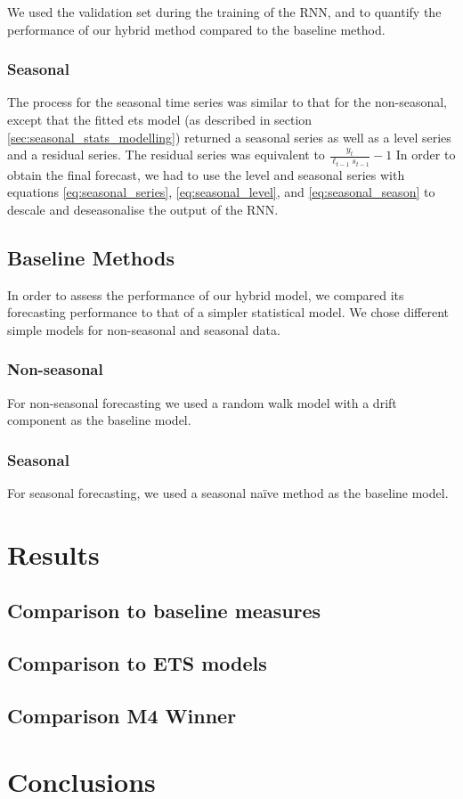 \documentclass[a4paper,12pt]{article}
\theoremstyle{definition}
\begin{document}
We used the validation set during the training of the RNN, and to quantify the performance of our hybrid method compared to the baseline method.

\subsubsection{Seasonal}
The process for the seasonal time series was similar to that for the non-seasonal, except that the fitted ets model (as described in section \ref{sec:seasonal_stats_modelling}) returned a seasonal series as well as a level series and a residual series. The residual series was equivalent to $\frac{y_t}{\ell_{t-1}s_{t-1}} - 1$ In order to obtain the final forecast, we had to use the level and seasonal series with equations \ref{eq:seasonal_series}, \ref{eq:seasonal_level}, and \ref{eq:seasonal_season} to descale and deseasonalise the output of the RNN.

\subsection{Baseline Methods}
In order to assess the performance of our hybrid model, we compared its forecasting performance to that of a simpler statistical model. We chose different simple models for non-seasonal and seasonal data.

\subsubsection{Non-seasonal}
For non-seasonal forecasting we used a random walk model with a drift component as the baseline model.

\subsubsection{Seasonal}
For seasonal forecasting, we used a seasonal na{\"i}ve method as the baseline model.


\section{Results}
\subsection{Comparison to baseline measures}

\subsection{Comparison to ETS models}

\subsection{Comparison M4 Winner}

\section{Conclusions}

\newpage


\end{document}

